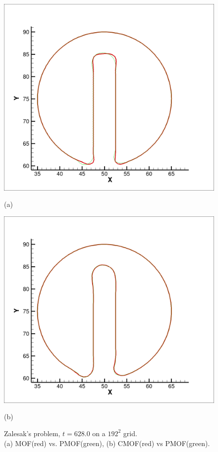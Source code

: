 \documentclass[preprint,12pt]{Definitions/elsarticle}
\begin{document}
\begin{figure}[H]
	\centering
	\begin{minipage}[]{.49\linewidth}
		\centering
		\includegraphics[width=1\textwidth]{MOF_red_PMOF_green.png}
		\caption{(a)}
		\label{zalesak_compare1}
	\end{minipage}
	\begin{minipage}[]{.49\linewidth}
		\centering
		\includegraphics[width=1\textwidth]{CMOF_red_PMOF_green.png}
		\caption{(b)}
	\end{minipage}
	\caption{Zalesak's problem, $t=628.0$ on a $192^{2}$ grid.\\
			(a) MOF(red) vs. PMOF(green), (b) CMOF(red) vs PMOF(green).}
	\label{zalesak_compare}
\end{figure}
\end{document}
